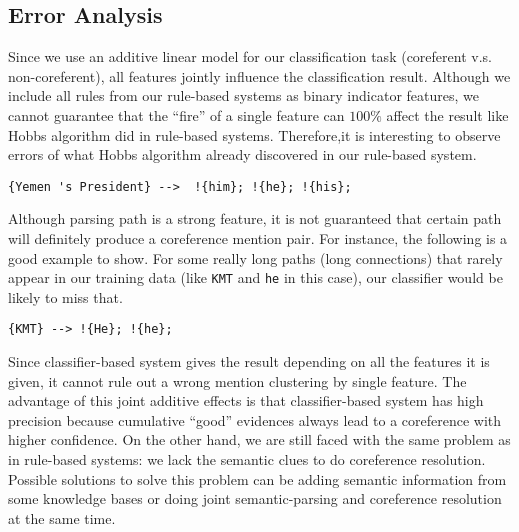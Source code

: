 \documentclass[letterpaper]{article}
\begin{document}
\subsection{Error Analysis}
Since we use an additive linear model for our classification task (coreferent v.s. non-coreferent), all features jointly influence the classification result.
Although we include all rules from our rule-based systems as binary indicator features, we cannot guarantee that the ``fire'' of a single feature can $100\%$ affect the result like Hobbs algorithm did in rule-based systems.
Therefore,it is interesting to observe errors of what Hobbs algorithm already discovered in our rule-based system.
\begin{verbatim}
{Yemen 's President} -->  !{him}; !{he}; !{his}; 
\end{verbatim}
Although parsing path is a strong feature, it is not guaranteed that certain path will definitely produce a coreference mention pair. For instance, the following is a good example to show. For some really long paths (long connections) that rarely appear in our training data (like \texttt{KMT} and \texttt{he} in this case), our classifier would be likely to miss that.
\begin{verbatim}
{KMT} --> !{He}; !{he};
\end{verbatim}
Since classifier-based system gives the result depending on all the features it is given, it cannot rule out a wrong mention clustering by single feature.
The advantage of this joint additive effects is that classifier-based system has high precision because cumulative ``good'' evidences always lead to a coreference with higher confidence. On the other hand, we are still faced with the same problem as in rule-based systems: we lack the semantic clues to do coreference resolution. Possible solutions to solve this problem can be adding semantic information from some knowledge bases or doing joint semantic-parsing and coreference resolution at the same time.
\end{document}
